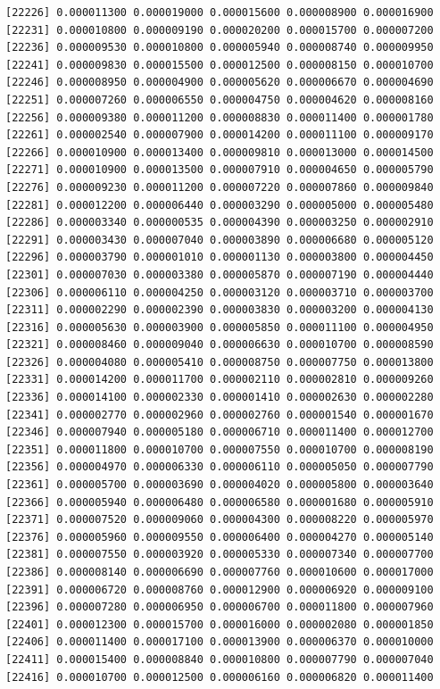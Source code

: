 \documentclass[]{article}
\begin{document}
\begin{verbatim}
[22226] 0.000011300 0.000019000 0.000015600 0.000008900 0.000016900
[22231] 0.000010800 0.000009190 0.000020200 0.000015700 0.000007200
[22236] 0.000009530 0.000010800 0.000005940 0.000008740 0.000009950
[22241] 0.000009830 0.000015500 0.000012500 0.000008150 0.000010700
[22246] 0.000008950 0.000004900 0.000005620 0.000006670 0.000004690
[22251] 0.000007260 0.000006550 0.000004750 0.000004620 0.000008160
[22256] 0.000009380 0.000011200 0.000008830 0.000011400 0.000001780
[22261] 0.000002540 0.000007900 0.000014200 0.000011100 0.000009170
[22266] 0.000010900 0.000013400 0.000009810 0.000013000 0.000014500
[22271] 0.000010900 0.000013500 0.000007910 0.000004650 0.000005790
[22276] 0.000009230 0.000011200 0.000007220 0.000007860 0.000009840
[22281] 0.000012200 0.000006440 0.000003290 0.000005000 0.000005480
[22286] 0.000003340 0.000000535 0.000004390 0.000003250 0.000002910
[22291] 0.000003430 0.000007040 0.000003890 0.000006680 0.000005120
[22296] 0.000003790 0.000001010 0.000001130 0.000003800 0.000004450
[22301] 0.000007030 0.000003380 0.000005870 0.000007190 0.000004440
[22306] 0.000006110 0.000004250 0.000003120 0.000003710 0.000003700
[22311] 0.000002290 0.000002390 0.000003830 0.000003200 0.000004130
[22316] 0.000005630 0.000003900 0.000005850 0.000011100 0.000004950
[22321] 0.000008460 0.000009040 0.000006630 0.000010700 0.000008590
[22326] 0.000004080 0.000005410 0.000008750 0.000007750 0.000013800
[22331] 0.000014200 0.000011700 0.000002110 0.000002810 0.000009260
[22336] 0.000014100 0.000002330 0.000001410 0.000002630 0.000002280
[22341] 0.000002770 0.000002960 0.000002760 0.000001540 0.000001670
[22346] 0.000007940 0.000005180 0.000006710 0.000011400 0.000012700
[22351] 0.000011800 0.000010700 0.000007550 0.000010700 0.000008190
[22356] 0.000004970 0.000006330 0.000006110 0.000005050 0.000007790
[22361] 0.000005700 0.000003690 0.000004020 0.000005800 0.000003640
[22366] 0.000005940 0.000006480 0.000006580 0.000001680 0.000005910
[22371] 0.000007520 0.000009060 0.000004300 0.000008220 0.000005970
[22376] 0.000005960 0.000009550 0.000006400 0.000004270 0.000005140
[22381] 0.000007550 0.000003920 0.000005330 0.000007340 0.000007700
[22386] 0.000008140 0.000006690 0.000007760 0.000010600 0.000017000
[22391] 0.000006720 0.000008760 0.000012900 0.000006920 0.000009100
[22396] 0.000007280 0.000006950 0.000006700 0.000011800 0.000007960
[22401] 0.000012300 0.000015700 0.000016000 0.000002080 0.000001850
[22406] 0.000011400 0.000017100 0.000013900 0.000006370 0.000010000
[22411] 0.000015400 0.000008840 0.000010800 0.000007790 0.000007040
[22416] 0.000010700 0.000012500 0.000006160 0.000006820 0.000011400

\end{verbatim}
\end{document}
